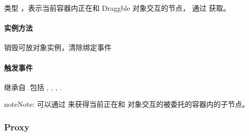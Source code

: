 \documentclass[letterpaper,10pt,english]{sphinxmanual}
\begin{document}
\begin{fulllineitems}
\label{api/component/dd/droppable-delegate:DD.DroppableDelegate.node}
类型  ，表示当前容器内正在和 Draggble 对象交互的节点，
通过 {\hyperref[api/component/dd/droppable-delegate:DD.DroppableDelegate.config.selector]{}} 获取。

\end{fulllineitems}



\paragraph{实例方法}
\label{api/component/dd/droppable-delegate:id4}

\begin{fulllineitems}
\label{api/component/dd/droppable-delegate:DD.DroppableDelegate.destroy}
销毁可放对象实例，清除绑定事件

\end{fulllineitems}



\paragraph{触发事件}
\label{api/component/dd/droppable-delegate:id5}
继承自 {\hyperref[api/component/dd/droppable:DD.Droppable]{}} .包括 {\hyperref[api/component/dd/droppable:DD.Droppable.dropenter]{}} , {\hyperref[api/component/dd/droppable:DD.Droppable.dropover]{}} , {\hyperref[api/component/dd/droppable:DD.Droppable.dropexit]{}} , {\hyperref[api/component/dd/droppable:DD.Droppable.drophit]{}} .

\begin{notice}{note}{Note:}
可以通过 {\hyperref[api/component/dd/droppable-delegate:DD.DroppableDelegate.node]{}} 来获得当前正在和 {\hyperref[api/component/dd/draggable:DD.Draggable]{}} 对象交互的被委托的容器内的子节点。
\end{notice}


\subsubsection{Proxy}
\label{api/component/dd/proxy::doc}\label{api/component/dd/proxy:proxy}
\end{document}
